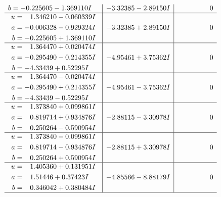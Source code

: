 \documentclass[1p]{elsarticle_modified}
\theoremstyle{definition}
\begin{document}
$$\begin{array}{c|c|c}
\begin{aligned}
b &= -0.225605 - 1.369110 I\end{aligned}
 & -3.32385 - 2.89150 I & \phantom{-0.000000 } 0 \\ \hline\begin{aligned}
u &= \phantom{-}1.346210 - 0.060339 I \\
a &= -0.006328 - 0.929324 I \\
b &= -0.225605 + 1.369110 I\end{aligned}
 & -3.32385 + 2.89150 I & \phantom{-0.000000 } 0 \\ \hline\begin{aligned}
u &= \phantom{-}1.364470 + 0.020474 I \\
a &= -0.295490 - 0.214355 I \\
b &= -4.33439 + 0.52295 I\end{aligned}
 & -4.95461 + 3.75362 I & \phantom{-0.000000 } 0 \\ \hline\begin{aligned}
u &= \phantom{-}1.364470 - 0.020474 I \\
a &= -0.295490 + 0.214355 I \\
b &= -4.33439 - 0.52295 I\end{aligned}
 & -4.95461 - 3.75362 I & \phantom{-0.000000 } 0 \\ \hline\begin{aligned}
u &= \phantom{-}1.373840 + 0.099861 I \\
a &= \phantom{-}0.819714 + 0.934876 I \\
b &= \phantom{-}0.250264 - 0.590954 I\end{aligned}
 & -2.88115 - 3.30978 I & \phantom{-0.000000 } 0 \\ \hline\begin{aligned}
u &= \phantom{-}1.373840 - 0.099861 I \\
a &= \phantom{-}0.819714 - 0.934876 I \\
b &= \phantom{-}0.250264 + 0.590954 I\end{aligned}
 & -2.88115 + 3.30978 I & \phantom{-0.000000 } 0 \\ \hline\begin{aligned}
u &= \phantom{-}1.405360 + 0.131951 I \\
a &= \phantom{-}1.51446 + 0.37423 I \\
b &= \phantom{-}0.346042 + 0.380484 I\end{aligned}
 & -4.85566 - 8.88179 I & \phantom{-0.000000 } 0\\
 \hline 
 \end{array}$$\newpage$$\begin{array}{c|c|c}  

\end{array}$$
\end{document}
